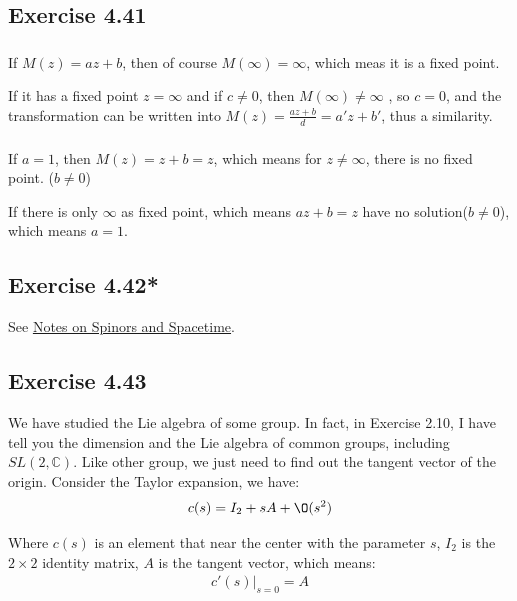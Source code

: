 \documentclass[]{ctexart}
\begin{document}
	\subsection{Exercise 4.41}
		\subsubsection{}
			If $M(z)=az+b$, then of course $M(\infty)=\infty$, which meas it is a fixed point. 
			
			If it has a fixed point $z=\infty$ and if $c\neq 0$, then $M(\infty)\neq \infty$ , so $c=0$, and the transformation can be written into $M(z)=\frac{az+b}{d}=a'z+b'$, thus a similarity. 
		
		\subsubsection{}
			If $a=1$, then $M(z)=z+b=z$, which means for $z\neq \infty$, there is no fixed point. ($b\neq 0$)
			
			If there is only $\infty$ as fixed point, which means $az+b=z$ have no solution($b\neq 0$), which means $a=1$.  
		
	\subsection{Exercise 4.42*}
		See \href{Notes on spinors and spacetime.pdf}{Notes on Spinors and Spacetime}. 
	
	\subsection{Exercise 4.43}
		We have studied the Lie algebra of some group. In fact, in Exercise 2.10, I have tell you the dimension and the Lie algebra of common groups, including $SL(2,\mathbb{C})$. Like other group, we just need to find out the tangent vector of the origin. Consider the Taylor expansion, we have:
			\begin{equation*}
			\begin{aligned}
				c(s)=I_2+sA+\O(s^2)
			\end{aligned}
			\end{equation*}
		
		Where $c(s)$ is an element that near the center with the parameter $s$, $I_2$ is the $2\times 2$ identity matrix, $A$ is the tangent vector, which means:
			\begin{equation*}
			\begin{aligned}
				c'(s)|_{s=0}=A
			\end{aligned}
			\end{equation*}
		
\end{document}
